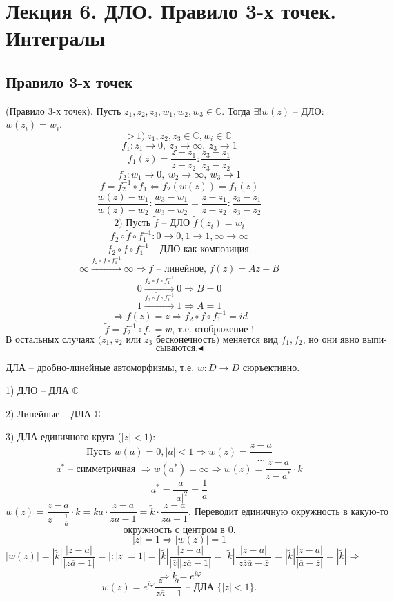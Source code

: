 \section{Лекция 6. ДЛО. Правило 3-х точек. Интегралы}
\subsection{Правило 3-х точек}
 (Правило 3-х точек). Пусть $z_1, z_2, z_3, w_1, w_2, w_3 \in \mathbb{C}$. Тогда $\exists ! w(z)$ -- ДЛО: $w(z_i)=w_i$.
\[\triangleright \ 1) \ z_1, z_2, z_3 \in \mathbb{C}, w_i \in \mathbb{C}\]
\[f_1: z_1 \to 0, \ z_2 \to \infty, \ z_3 \to 1\]
\[f_1(z) = \frac{z-z_1}{z-z_2} : \frac{z_3-z_1}{z_3-z_2}\]
\[f_2: w_1 \to 0, \ w_2 \to \infty, \ w_3 \to 1\]
\[f = f_2^{-1} \circ f_1 \Leftrightarrow f_2(w(z)) = f_1(z)\]
\[\frac{w(z)-w_1}{w(z)-w_2} : \frac{w_3-w_1}{w_3-w_2} = \frac{z-z_1}{z-z_2} : \frac{z_3-z_1}{z_3-z_2}\]
\[2) \text{ Пусть $\tilde{f}$ -- ДЛО } \tilde{f}(z_i)=w_i\]
\[f_2 \circ \tilde{f} \circ f_1^{-1}: 0 \to 0, 1 \to 1, \infty \to \infty\]
\[f_2 \circ \tilde{f} \circ f_1^{-1} \text{ -- ДЛО как композиция.}\]
\[\infty \overset{f_2 \circ \tilde{f} \circ f_1^{-1}}{\to} \infty \Rightarrow f \text{ -- линейное, } f(z) = Az+B\]
\[0 \overset{f_2 \circ \tilde{f} \circ f_1^{-1}}{\to} 0 \Rightarrow B = 0\]
\[1 \overset{f_2 \circ \tilde{f} \circ f_1^{-1}}{\to} 1 \Rightarrow A = 1\]
\[\Rightarrow f(z) = z \Rightarrow f_2 \circ \tilde{f} \circ f_1^{-1} = id \]
\[\tilde{f} = f_2^{-1} \circ f_1 = w \text{, т.е. отображение } !\]
\[\text{В остальных случаях ($z_1, z_2$ или $z_3$ бесконечность) меняется вид }f_1, f_2 \text{, но они явно выпи-}\]\[\text{сываются.} \blacktriangleleft\]

 ДЛА -- дробно-линейные автоморфизмы, т.е. $w:D \to D$ сюръективно.

1) ДЛО -- ДЛА $\overline{\mathbb{C}}$

2) Линейные -- ДЛА $\mathbb{C}$

3) ДЛА единичного круга ($|z|<1$):
\[\text{Пусть } w(a) = 0, |a|<1 \Rightarrow w(z) = \frac{z-a}{...}\]
\[a^* \text{ -- симметричная } \Rightarrow w(a^*)=\infty \Rightarrow w(z) = \frac{z-a}{z-a^*} \cdot k\]
\[a^* = \frac{a}{|a|^2} = \frac{1}{\overline{a}}\]
\[w(z) = \frac{z-a}{z-\frac{1}{\overline{a}}}\cdot k = k\overline{a} \cdot \frac{z-a}{z\overline{a}-1} = \tilde{k}\cdot \frac{z-a}{z\overline{a}-1} \text{. Переводит единичную окружность в какую-то}\]
\[\text{окружность с центром в 0.}\]
\[|z|=1 \Rightarrow |w(z)|=1\]
\[|w(z)|=|\tilde{k}| \frac{|z-a|}{|z\overline{a}-1|} = \left|: |\overline{z}|=1\right| =|\tilde{k}| \frac{|z-a|}{|\overline{z}| |z\overline{a}-1|}=|\tilde{k}|\frac{|z-a|}{|z\overline{z}\overline{a}-\overline{z}|}=|\tilde{k}|\frac{|z-a|}{|\overline{a}-\overline{z}|}=|\tilde{k}| \Rightarrow\] 
\[\Rightarrow \tilde{k} =e^{i\varphi}\]
\[w(z) = e^{i\varphi} \frac{z-a}{z\overline{a}-1} \text{ -- ДЛА } \{|z|<1\}.\]


